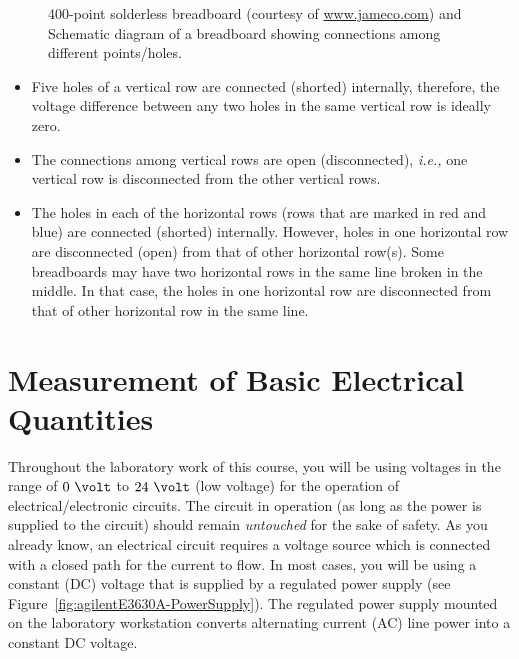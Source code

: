 \begin{figure}
{{
} %
} 
  \caption{ 400-point solderless breadboard (courtesy of \url{www.jameco.com})  and~ Schematic diagram of a breadboard showing connections among different points/holes.}
  \label{fig:breadboard}
\end{figure}

\begin{itemize}
\item Five holes of a vertical row are connected (shorted) internally, therefore, the voltage difference between any two holes in the same vertical row is ideally zero. 
\item The connections among vertical rows are open (disconnected), \textit{i.e.,} one vertical row is disconnected from the other vertical rows.
\item The holes in each of the horizontal rows (rows that are marked in red and blue) are connected (shorted) internally.
  However, holes in one horizontal row are disconnected (open) from that of
  other horizontal row(s). Some breadboards may have two horizontal rows in the
  same line broken in the middle. In that case, the holes in one horizontal row
  are disconnected from that of other horizontal row in the same line.
\end{itemize}


\section{Measurement of Basic Electrical Quantities}
\label{sec:measurement}


Throughout the laboratory work of this course, you will be using voltages in the range of $0~\volt$ to $24~\volt$ (low voltage) for the operation of electrical/electronic circuits.  The circuit in operation (as long as the power is supplied to the circuit) should remain \emph{untouched} for the sake of safety. As you already know, an electrical circuit requires a voltage source which is connected with a closed path for the current to flow. In most cases, you will be using a constant (DC) voltage that is supplied by a regulated power supply (see Figure~\ref{fig:agilentE3630A-PowerSupply}). The regulated power supply mounted on the laboratory workstation converts alternating current (AC) line power into a constant DC voltage.  

